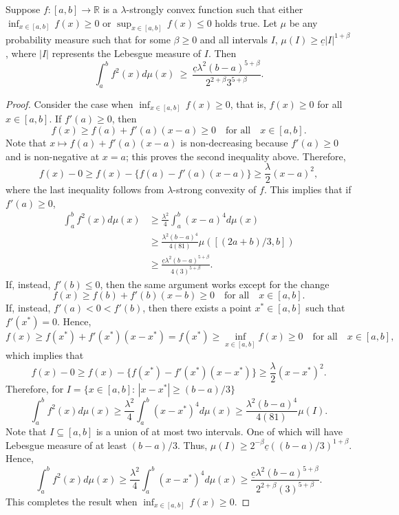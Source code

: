 {{ 
\begin{lemma}\label{lem:special-case}
Suppose $f:[a,b] \to \mathbb{R}$ is a $\lambda$-strongly convex function such that either $\inf_{x\in[a,b]}\,f(x) \ge 0$ or $\sup_{x\in[a,b]}\,f(x) \le 0$ holds true. Let $\mu$ be any probability measure such that for some $\beta \ge 0$ and all intervals $I$, $\mu(I) \ge \underline{c}|I|^{1 + \beta}$, where $|I|$ represents the Lebesgue measure of $I$. Then
\[
\int_a^b f^2(x)d\mu(x) ~\ge~ \frac{\underline{c}\lambda^2(b - a)^{5 + \beta}}{2^{2 + \beta}3^{5 + \beta}}.
\] 
\end{lemma}
\begin{proof}
Consider the case when $\inf_{x\in[a,b]}\,f(x) \ge 0$, that is, $f(x) \ge 0$ for all $x\in[a,b]$. If $f'(a) \ge 0$, then
\[
f(x) \ge f(a) + f'(a)(x - a) \ge 0\quad\mbox{for all}\quad x \in [a,b].
\] 
Note that $x\mapsto f(a) + f'(a)(x - a)$ is non-decreasing because $f'(a) \ge 0$ and is non-negative at $x = a$; this proves the second inequality above. Therefore, 
\[
f(x) - 0 \ge f(x) - \{f(a) - f'(a)(x - a)\} \ge \frac{\lambda}{2}(x - a)^2,
\] 
where the last inequality follows from $\lambda$-strong convexity of $f$. This implies that if $f'(a) \ge 0$,
\begin{align*}
\int_a^b f^2(x)d\mu(x) &\ge \frac{\lambda^2}{4}\int_a^b (x - a)^4d\mu(x)\\ 
&\ge \frac{\lambda^2(b - a)^4}{4(81)}\mu([(2a + b)/3, b])\\
&\ge \frac{\underline{c}\lambda^2(b-a)^{5 + \beta}}{4(3)^{5 + \beta}}.
\end{align*}
If, instead, $f'(b) \le 0$, then the same argument works except for the change
\[
f(x) \ge f(b) + f'(b)(x - b) \ge 0\quad\mbox{for all}\quad x\in[a, b].
\]
If, instead, $f'(a) < 0 < f'(b)$, then there exists a point $x^*\in[a, b]$ such that $f'(x^*) = 0$. Hence,
\[
f(x) \ge f(x^*) + f'(x^*)(x - x^*) = f(x^*) \ge \inf_{x\in[a,b]}f(x) \ge 0\quad\mbox{for all}\quad x\in[a, b],
\]
which implies that
\[
f(x) - 0 \ge f(x) - \{f(x^*) - f'(x^*)(x - x^*)\} \ge \frac{\lambda}{2}(x - x^*)^2.
\]
Therefore, for $I = \{x\in[a, b]:\,|x - x^*| \ge (b - a)/3\}$
\[
\int_a^b f^2(x)d\mu(x) \ge \frac{\lambda^2}{4}\int_a^b (x - x^*)^4d\mu(x) \ge \frac{\lambda^2(b - a)^4}{4(81)}\mu(I).
\]
Note that $I\subseteq[a,b]$ is a union of at most two intervals. One of which will have Lebesgue measure of at least $(b - a)/3$. Thus, $\mu(I) \ge 2^{-\beta}\underline{c}((b-a)/3)^{1 + \beta}$. Hence,
\[
\int_a^b f^2(x)d\mu(x) \ge \frac{\lambda^2}{4}\int_a^b (x - x^*)^4d\mu(x) \ge \frac{\underline{c}\lambda^2(b - a)^{5 + \beta}}{2^{2 + \beta}(3)^{5 + \beta}}.
\] 
This completes the result when $\inf_{x\in[a,b]}\,f(x) \ge 0$.


\end{proof}}}
